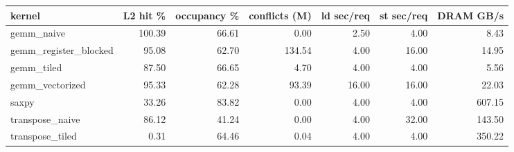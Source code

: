 \begin{tabular}{lrrrrrr}
\toprule
kernel & L2 hit \% & occupancy \% & conflicts (M) & ld sec/req & st sec/req & DRAM GB/s \\
\midrule
gemm\_naive & 100.39 & 66.61 & 0.00 & 2.50 & 4.00 & 8.43 \\
gemm\_register\_blocked & 95.08 & 62.70 & 134.54 & 4.00 & 16.00 & 14.95 \\
gemm\_tiled & 87.50 & 66.65 & 4.70 & 4.00 & 4.00 & 5.56 \\
gemm\_vectorized & 95.33 & 62.28 & 93.39 & 16.00 & 16.00 & 22.03 \\
saxpy & 33.26 & 83.82 & 0.00 & 4.00 & 4.00 & 607.15 \\
transpose\_naive & 86.12 & 41.24 & 0.00 & 4.00 & 32.00 & 143.50 \\
transpose\_tiled & 0.31 & 64.46 & 0.04 & 4.00 & 4.00 & 350.22 \\
\bottomrule
\end{tabular}
